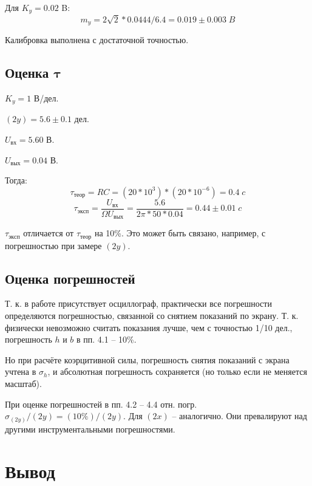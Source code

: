 \documentclass[a4paper]{article}
\begin{document}
Для $ K_y = 0.02 $ B:
\begin{equation*}\label{key}
	m_y = 2 \sqrt{2} * 0.0444 / 6.4 = 0.019\pm 0.003 \; B
\end{equation*}

Калибровка выполнена с достаточной точностью.

\subsection{Оценка $ \mathbf{\tau} $}

$ K_y = 1 $ В/дел.

$ (2y) = 5.6\pm 0.1 $ дел.

$ U_{вх} = 5.60 $ В.

$ U_{вых} = 0.04 $ В.

Тогда:
\begin{equation*}\label{key}
	\tau_{теор} = R C = (20*10^3)*(20*10^{-6}) = 0.4\; c
\end{equation*}
\begin{equation*}\label{key}
	\tau_{эксп} = \frac{U_{вх}}{\Omega U_{вых}} = \frac{5.6}{2 \pi * 50 * 0.04} = 0.44\pm 0.01 \; c
\end{equation*}

$ \tau_{эксп} $ отличается от $ \tau_{теор} $ на 10\%. Это может быть связано, например, с погрешностью при замере $ (2y) $.

\subsection{Оценка погрешностей}

Т. к. в работе присутствует осциллограф, практически все погрешности определяются погрешностью, связанной со снятием показаний по экрану. Т. к. физически невозможно считать показания лучше, чем с точностью 1/10 дел., погрешность $ h $ и $ b $ в пп. 4.1 -- 10\%.

Но при расчёте коэрцитивной силы, погрешность снятия показаний с экрана учтена в $ \sigma_h $, и абсолютная погрешность сохраняется (но только если не меняется масштаб). 

При оценке погрешностей в пп. 4.2 -- 4.4 отн. погр. $ \sigma_{(2 y)}/(2 y) = (10\%)/(2 y) $. Для $ (2 x) $ -- аналогично. Они превалируют над другими инструментальными погрешностями.

\section{Вывод}
\end{document}
